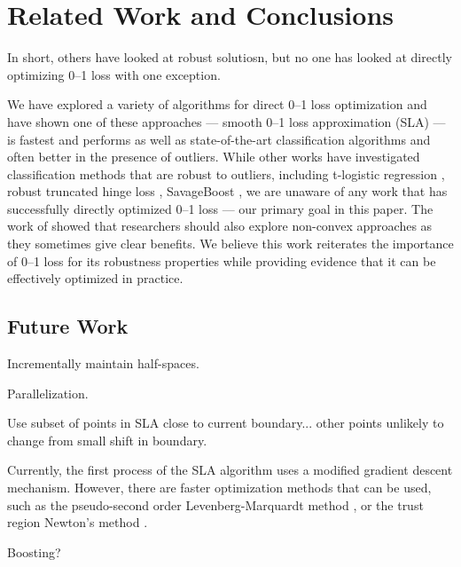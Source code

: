 \section{Related Work and Conclusions}
\label{cha:conclusions}

\MYCOMMENT
In short, others have looked at robust solutiosn, but no one
has looked at directly optimizing 0--1 loss with one
exception.
\ENDMYCOMMENT

We have explored a variety of algorithms for direct 0--1 loss
optimization and have shown one of these approaches --- smooth
0--1 loss approximation (SLA) --- is fastest and performs as well as
state-of-the-art classification algorithms and often better in the
presence of outliers.  While other works have investigated
classification methods that are robust to outliers, including
t-logistic regression \cite{Ding}, robust truncated hinge loss
\cite{wu07}, SavageBoost \cite{lossdesign},
we are unaware of any
work that has successfully directly optimized 0--1 loss --- our
primary goal in this paper. The work of \cite{collobert} showed that
researchers should also explore non-convex approaches as they 
sometimes give clear benefits. We believe this work reiterates the
importance of 0--1 loss for its robustness properties while providing
evidence that it can be effectively optimized in practice.

\MYCOMMENT

\subsection{Future Work}
\label{sec:concl.futurework}

Incrementally maintain half-spaces.

Parallelization.

Use subset of points in SLA close to current boundary... other
points unlikely to change from small shift in boundary.

Currently, the first process of the SLA algorithm uses a modified
gradient descent mechanism. However, there are faster optimization
methods that can be used, such as the pseudo-second order
Levenberg-Marquardt method \cite{Marquardt}, or the trust region
Newton's method \cite{Steihaug}.

Boosting?

\ENDMYCOMMENT
